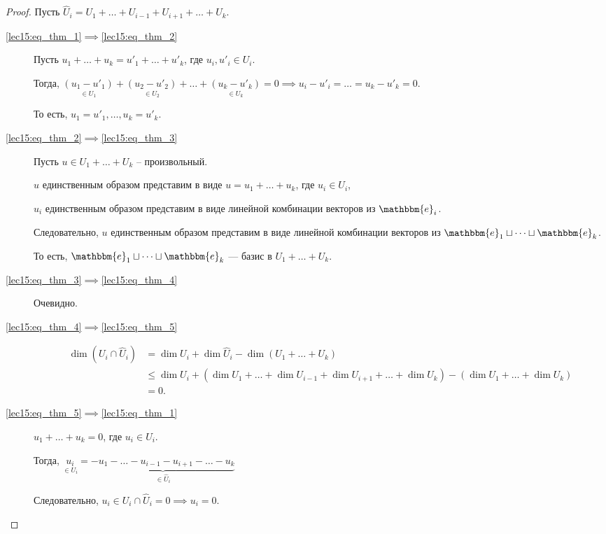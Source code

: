 \begin{proof}
    \newcommand\E{\mathbbm{e}}
    Пусть $\widehat{U}_i = U_1 + \dots + U_{i - 1} + U_{i + 1} + \dots + U_k$.

    \begin{description}
    \item[\ref{lec15:eq_thm_1}$\implies$\ref{lec15:eq_thm_2}]
        Пусть $u_1 + \dots + u_k = u'_1 + \dots + u'_k$, где $u_i, u'_i \in U_i$.

        Тогда, $\underset{\in U_1}{(u_1 - u'_1)} + \underset{\in U_2}{(u_2 - u'_2)} + \dots + \underset{\in U_k}{(u_k - u'_k)} = 0 \implies u_i - u'_i = \dots = u_k - u'_k = 0$.

        То есть, $u_1 = u'_1, \dots, u_k = u'_k$.

    \item[\ref{lec15:eq_thm_2}$\implies$\ref{lec15:eq_thm_3}]
        Пусть $u \in U_1 + \dots + U_k$ -- произвольный.

        $u$ единственным образом представим в виде $u = u_1 + \dots + u_k$, где $u_i \in U_i$,

        $u_i$ единственным образом представим в виде линейной комбинации векторов из $\E_i$.
 
        Следовательно, $u$ единственным образом представим в виде линейной комбинации векторов из $\E_1 \sqcup \dots \sqcup \E_k$.

        То есть, $\E_1 \sqcup \dots \sqcup \E_k$ --- базис в $U_1 + \dots + U_k$.

    \item[\ref{lec15:eq_thm_3}$\implies$\ref{lec15:eq_thm_4}]
        Очевидно. 

    \item[\ref{lec15:eq_thm_4}$\implies$\ref{lec15:eq_thm_5}]
        \begin{align*}
            \dim (U_i \cap \widehat{U}_i) 
            &= \dim U_i + \dim \widehat{U}_i - \dim (U_1 + \dots + U_k) \\
            &\leq \dim U_i + (\dim U_1 + \dots + \dim U_{i - 1} + \dim U_{i + 1} + \dots + \dim U_k) - (\dim U_1 + \dots + \dim U_k) \\
            &= 0
        .\end{align*}

    \item[\ref{lec15:eq_thm_5}$\implies$\ref{lec15:eq_thm_1}]
        $u_1 + \dots + u_k = 0$, где $u_i \in U_i$.

        Тогда, $\underset{\in U_i}{u_i} = \underbrace{-u_1 - \dots - u_{i - 1} - u_{i + 1} - \dots - u_k}_{\in \widehat{U}_i}$

        Следовательно, $u_i \in U_i \cap \widehat{U}_i = 0 \implies u_i = 0$.
        \qedhere
    \end{description}
\end{proof}

